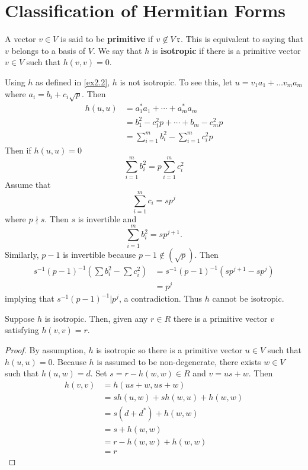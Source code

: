 \section{Classification of Hermitian Forms}

A vector $v \in V$ is said to be \textbf{primitive} if $v \not\in V \mathfrak{r}$.
This is equivalent to saying that $v$ belongs to a basis of $V$.
We say that $h$ is \textbf{isotropic} if there is a primitive vector $v \in V$ such that $h(v,v) = 0$.

\begin{example}\label{ex3.1}
Using $h$ as defined in \cref{ex2.2}, $h$ is not isotropic.
To see this, let $u = v_1 a_1 + \dotsc v_m a_m$ where $a_i = b_i + c_i \sqrt{p}$.
Then
\begin{align*}
h(u,u) &= a_1^* a_1 + \dotsb + a_m^*a_m\\
&= b_1^2 - c_1^2 p + \dotsb + b_m - c_m^2p\\
&= \sum_{i=1}^m b_i^2 - \sum_{i=1}^m c_i^2 p
\end{align*}
Then if $h(u,u) = 0$
\[
\sum_{i=1}^m b_i^2 = p \sum_{i=1}^m c_i^2
\]
Assume that
\[
\sum_{i=1}^m c_i = s p^j
\]
where $p \nmid s$.
Then $s$ is invertible and 
\[
\sum_{i=1}^m b_i^2 = sp^{j+1}.
\]
Similarly, $p-1$ is invertible because $p-1 \not\in (\sqrt{p})$.
Then
\begin{align*}
s^{-1}(p-1)^{-1}\left(\sum b_i^2 - \sum c_i^2 \right) &= s^{-1}(p-1)^{-1}(sp^{j+1} - sp^j)\\
&= p^j
\end{align*}
implying that $s^{-1}(p-1)^{-1} | p^j$, a contradiction.
Thus $h$ cannot be isotropic.
\end{example}

\begin{lemma}\label{lemma3.1}
Suppose $h$ is isotropic. Then, given any $r \in R$ there is a primitive vector $v$ satisfying $h(v,v) = r$.
\end{lemma}

\begin{proof}
By assumption, $h$ is isotropic so there is a primitive vector $u \in V$ such that $h(u,u) = 0$.
Because $h$ is assumed to be non-degenerate, there exists $w \in V$ such that $h(u,w) = d$.
Set $s = r - h(w,w) \in R$ and $v = us + w$.
Then
\begin{align*}
h(v,v) &= h(us + w, us + w) \\
&= sh(u,w) + sh(w,u) + h(w,w) \\
&= s(d + d^*) + h(w,w) \\
&= s + h(w,w)\\
&= r - h(w,w) + h(w,w)\\
&= r
\end{align*}
\end{proof}

